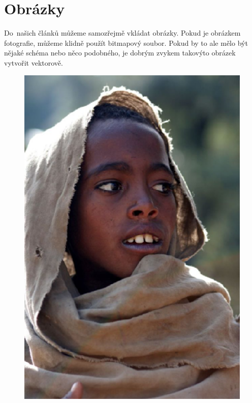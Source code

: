 \documentclass[11pt,a4paper]{article}
\begin{document}
\section{Obrázky}
    Do~našich článků můžeme samozřejmě vkládat obrázky. Pokud je obrázkem fotografie,
    můžeme klidně použít bitmapový soubor. Pokud by to ale mělo být nějaké schéma nebo
    něco podobného, je dobrým zvykem takovýto obrázek vytvořit vektorově.\\
    \begin{figure}[htb]
        \centering
        \scalebox{0.35}
        {
            \includegraphics{etiopan.eps}
}
\end{figure}
\end{document}
